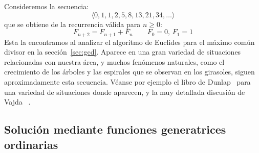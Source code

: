   Consideremos la secuencia:
  \begin{equation}
    \label{eq:Fibonacci-sequence}
    \langle 0, 1, 1, 2, 5, 8, 13, 21, 34, \dotsc \rangle
  \end{equation}
  que se obtiene de la recurrencia válida para \(n \ge 0\):
  \begin{equation}
    \label{eq:recurrence-Fibonacci}
    F_{n + 2}
      = F_{n + 1} + F_n
      \qquad \text{\(F_0 = 0\), \(F_1 = 1\)}
  \end{equation}
  Esta la encontramos al analizar el algoritmo de Euclides%
  para el máximo común divisor
  en la sección~\ref{sec:gcd}.
  Aparece en una gran variedad de situaciones
  relacionadas con nuestra área,
  y muchos fenómenos naturales,
  como el crecimiento de los árboles
  y las espirales que se observan en los girasoles,
  siguen aproximadamente esta secuencia.
  Véanse por ejemplo el libro de Dunlap~%
    \cite{dunlap98:_golden_ratio_fibonacci}
  para una variedad de situaciones donde aparecen,
  y la muy detallada discusión de Vajda~%
    \cite{vajda89:_fibonacci_lucas_number_golden_section}.

\subsection{Solución mediante funciones generatrices ordinarias}
\label{sec:Fibonacci-ordinarias}

